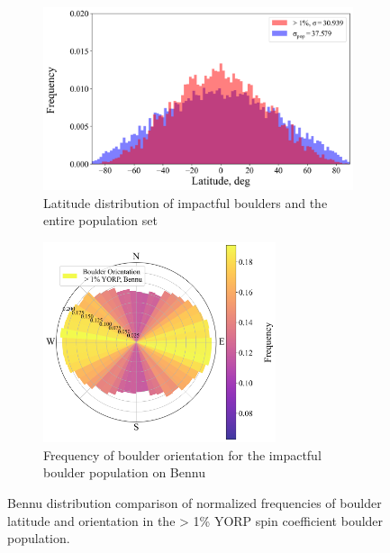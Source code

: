 \begin{figure}[t!]
    \centering
    \begin{subfigure}[t]{0.49\textwidth}
        \centering
        \includegraphics[width=\textwidth]{fig/bennu_impact_location_new.png}
        \caption{Latitude distribution of impactful boulders and the entire population set}
        \label{fig:latitudes}
    \end{subfigure}
    \hfill
    \begin{subfigure}[t]{0.49\textwidth}
        \centering
        \includegraphics[width=0.75\textwidth]{fig/bennu_impact_orient_new.png}
        \caption{Frequency of boulder orientation for the impactful boulder population on Bennu}
        \label{fig:orientation}
    \end{subfigure}
    \caption{Bennu distribution comparison of normalized frequencies of boulder latitude and orientation in the > 1\% YORP spin coefficient boulder population.}
    \label{fig:bennu_results}
\end{figure}

